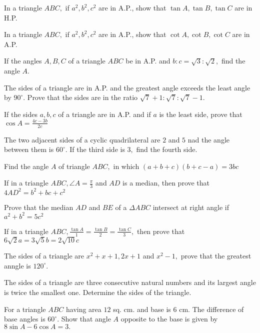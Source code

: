 \item In a triangle $ABC,$ if $a^2, b^2, c^2$ are in A.P., show that $\tan A, \tan B, \tan C$ are in H.P.

\item In a triangle $ABC,$ if $a^2, b^2, c^2$ are in A.P., show that $\cot A, \cot B, \cot C$ are in A.P.

\item If the angles $A, B, C$ of a triangle $ABC$ be in A.P. and $b:c = \sqrt{3}:\sqrt{2},$ find the angle
    $A.$

\item The sides of a triangle are in A.P. and the greatest angle exceeds the least angle by $90^\circ.$ Prove that the sides
    are in the ratio $\sqrt{7} + 1: \sqrt{7}: \sqrt{7} - 1.$

\item If the sides $a, b, c$ of a triangle are in A.P. and if $a$ is the least side, prove that $\cos A =
    \frac{4c - 3b}{2c}$

\item The two adjacent sides of a cyclic quadrilateral are $2$ and $5$ nad the angle between them is $60^\circ.$ If
    the third side is $3,$ find the fourth side.

\item Find the angle $A$ of triangle $ABC,$ in which $(a + b + c)(b + c - a) = 3bc$

\item If in a triangle $ABC, \angle A = \frac{\pi}{3}$ and $AD$ is a median, then prove that $4AD^2 = b^2 + bc +
    c^2$

\item Prove that the median $AD$ and $BE$ of a $\Delta ABC$ intersect at right angle if $a^2 + b^2 = 5c^2$

\item If in a triangle $ABC, \frac{\tan A}{1} = \frac{\tan B}{2} = \frac{\tan C}{3},$ then prove that $6\sqrt{2}a =
    3\sqrt{5}b = 2\sqrt{10}c$

\item The sides of a triangle are $x^2 + x + 1, 2x + 1$ and $x^2 - 1,$ prove that the greatest anngle is $120^\circ.$

\item The sides of a triangle are three consecutive natural numbers and its largest angle is twice the smallest one. Determine the
    sides of the triangle.

\item For a triangle $ABC$ having area $12$ sq. cm. and base is $6$ cm. The difference of base angles is
    $60^\circ.$ Show that angle $A$ opposite to the base is given by $8\sin A - 6\cos A = 3.$

